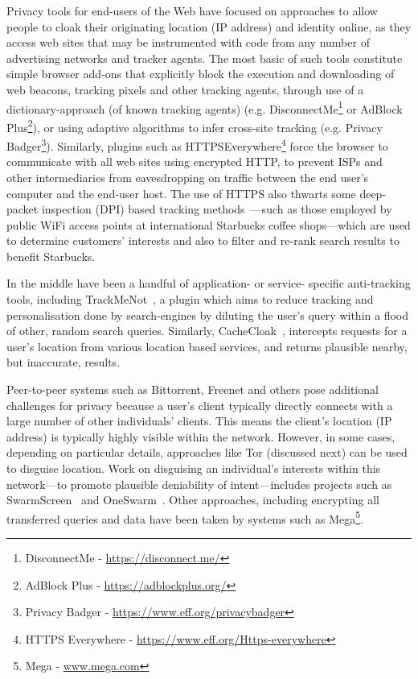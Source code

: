 \documentclass{IOS-Book-Article}     %
\begin{document}
Privacy tools for end-users of the Web have focused on approaches to allow
people to cloak their originating location (IP address) and identity online, as
they access web sites that may be instrumented with code from any number of
advertising networks and tracker agents.  The most basic of such tools
constitute simple browser add-ons that explicitly block the execution and
downloading of web beacons, tracking pixels and other tracking agents, through
use of a dictionary-approach (of known tracking agents) (e.g.
DisconnectMe\footnote{DisconnectMe - \url{https://disconnect.me/}} or AdBlock
Plus\footnote{AdBlock Plus - \url{https://adblockplus.org/}}), or using adaptive
algorithms to infer cross-site tracking (e.g. Privacy Badger\footnote{Privacy
Badger - \url{https://www.eff.org/privacybadger}}).  Similarly, plugins such as
HTTPSEverywhere\footnote{HTTPS Everywhere -
\url{https://www.eff.org/Https-everywhere}} force the browser to communicate
with all web sites using encrypted HTTP, to prevent ISPs and other
intermediaries from eavesdropping on traffic between the end user's computer and
the end-user host.  The use of HTTPS also thwarts some deep-packet inspection
(DPI) based tracking methods~\cite{kumar2006advanced}---such as those employed
by public WiFi access points at international Starbucks coffee shops---which are
used to determine customers' interests and also to filter and re-rank search
results to benefit Starbucks.                     

In the middle have been a handful of application- or service- specific
anti-tracking tools, including TrackMeNot~\cite{howe2009trackmenot}, a plugin
which aims to reduce tracking and personalisation done by search-engines by
diluting the user's query within a flood of other, random search queries.
Similarly, CacheCloak~\cite{Meyerowitz:2009:HSF:1614320.1614358}, intercepts
requests for a user's location from various location based services, and returns
plausible nearby, but inaccurate, results.

Peer-to-peer systems such as Bittorrent, Freenet and others pose additional
challenges for privacy because a user's client typically directly connects with
a large number of other individuals' clients.  This means the client's location
(IP address) is typically highly visible within the network. However, in some
cases, depending on particular details, approaches like Tor (discussed
next) can be used to disguise location.
Work on disguising an individual's interests within this network---to promote
plausible deniability of intent---includes projects such as
SwarmScreen~\cite{choffnes2009swarmscreen} and
OneSwarm~\cite{Isdal:2010:PPD:1851182.1851198}.  Other approaches, including
encrypting all transferred queries and data have been taken by systems such as
Mega\footnote{Mega - \url{www.mega.com}}.
\end{document}
